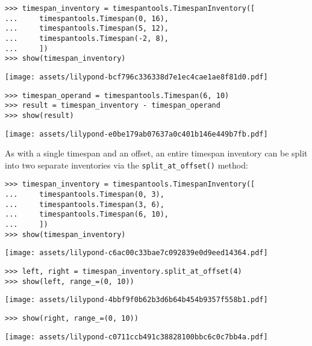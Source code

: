 \begin{abjadbookoutput}
\begin{singlespacing}
\vspace{-0.5\baselineskip}
\begin{lstlisting}
>>> timespan_inventory = timespantools.TimespanInventory([
...     timespantools.Timespan(0, 16),
...     timespantools.Timespan(5, 12),
...     timespantools.Timespan(-2, 8),
...     ])
>>> show(timespan_inventory)
\end{lstlisting}
\noindent\texttt{[image: assets/lilypond-bcf796c336338d7e1ec4cae1ae8f81d0.pdf]}
\begin{lstlisting}
>>> timespan_operand = timespantools.Timespan(6, 10)
>>> result = timespan_inventory - timespan_operand
>>> show(result)
\end{lstlisting}
\noindent\texttt{[image: assets/lilypond-e0be179ab07637a0c401b146e449b7fb.pdf]}
\end{singlespacing}
\end{abjadbookoutput}

\noindent As with a single timespan and an offset, an entire timespan inventory
can be split into two separate inventories via the \texttt{split\_at\_offset()}
method:

\begin{comment}
<abjad>
timespan_inventory = timespantools.TimespanInventory([
    timespantools.Timespan(0, 3),
    timespantools.Timespan(3, 6),
    timespantools.Timespan(6, 10),
    ])
show(timespan_inventory)
left, right = timespan_inventory.split_at_offset(4)
show(left, range_=(0, 10))
show(right, range_=(0, 10))
</abjad>
\end{comment}

\begin{abjadbookoutput}
\begin{singlespacing}
\vspace{-0.5\baselineskip}
\begin{lstlisting}
>>> timespan_inventory = timespantools.TimespanInventory([
...     timespantools.Timespan(0, 3),
...     timespantools.Timespan(3, 6),
...     timespantools.Timespan(6, 10),
...     ])
>>> show(timespan_inventory)
\end{lstlisting}
\noindent\texttt{[image: assets/lilypond-c6ac00c33bae7c092839e0d9eed14364.pdf]}
\begin{lstlisting}
>>> left, right = timespan_inventory.split_at_offset(4)
>>> show(left, range_=(0, 10))
\end{lstlisting}
\noindent\texttt{[image: assets/lilypond-4bbf9f0b62b3d6b64b454b9357f558b1.pdf]}
\begin{lstlisting}
>>> show(right, range_=(0, 10))
\end{lstlisting}
\noindent\texttt{[image: assets/lilypond-c0711ccb491c38828100bbc6c0c7bb4a.pdf]}
\end{singlespacing}
\end{abjadbookoutput}

